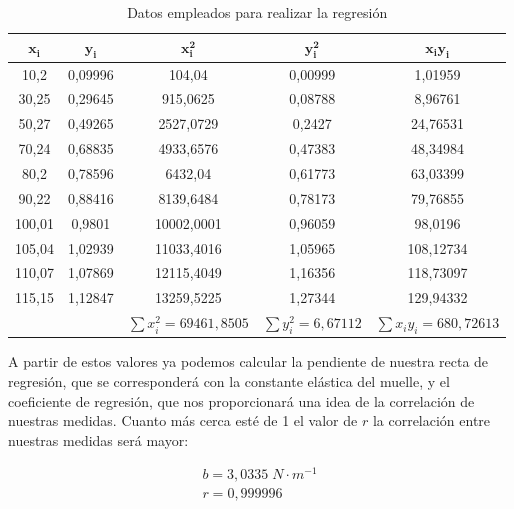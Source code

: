 \documentclass[a4paper,12pt,titlepage]{report}
\begin{document}
\begin{table}[h!]
    \centering
    \begin{tabular}{cc|c|c|c|}
    \hline
    \multicolumn{1}{|c|}{$\mathbf{x_i}$} & $\mathbf{y_{i}}$ & $\mathbf{x_ {i}^2}$ & $\mathbf{y_{i}^2}$ & $\mathbf{x_{i}y_{i}}$ \\ \hline
    \multicolumn{1}{|c|}{10,2}   & 0,09996 & 104,04     & 0,00999 & 1,01959   \\ \hline
    \multicolumn{1}{|c|}{30,25}  & 0,29645 & 915,0625   & 0,08788 & 8,96761   \\ \hline
    \multicolumn{1}{|c|}{50,27}  & 0,49265 & 2527,0729  & 0,2427  & 24,76531  \\ \hline
    \multicolumn{1}{|c|}{70,24}  & 0,68835 & 4933,6576  & 0,47383 & 48,34984  \\ \hline
    \multicolumn{1}{|c|}{80,2}   & 0,78596 & 6432,04    & 0,61773 & 63,03399  \\ \hline
    \multicolumn{1}{|c|}{90,22}  & 0,88416 & 8139,6484  & 0,78173 & 79,76855  \\ \hline
    \multicolumn{1}{|c|}{100,01} & 0,9801  & 10002,0001 & 0,96059 & 98,0196   \\ \hline
    \multicolumn{1}{|c|}{105,04} & 1,02939 & 11033,4016 & 1,05965 & 108,12734 \\ \hline
    \multicolumn{1}{|c|}{110,07} & 1,07869 & 12115,4049 & 1,16356 & 118,73097 \\ \hline
    \multicolumn{1}{|c|}{115,15} & 1,12847 & 13259,5225 & 1,27344 & 129,94332 \\ \hline
                                 &         & $\sum x_i^2=69461,8505$ & $\sum y_i^2=6,67112$ & $\sum x_i y_i=680,72613$ \\ \cline{3-5} 
    \end{tabular}
    \caption{Datos empleados para realizar la regresión}
    \label{Datos regresion 1}
    \end{table}

A partir de estos valores ya podemos calcular la pendiente de nuestra recta de regresión, que se corresponderá con la constante elástica del muelle, y el coeficiente de regresión, que nos proporcionará una idea de la correlación de nuestras medidas. Cuanto más cerca esté de 1 el valor de $r$ la correlación entre nuestras medidas será mayor:

\begin{equation}
    \begin{gathered}
        b = 3,0335 \; N \cdot m^{-1} \\
        r = 0,999996
    \end{gathered}
\end{equation}
\end{document}
